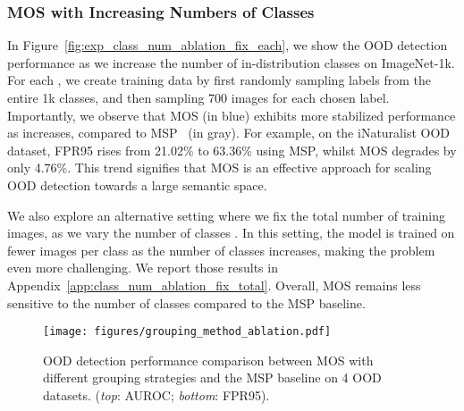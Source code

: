 \documentclass[final]{cvpr}
\begin{document}
\subsubsection{MOS with Increasing Numbers of Classes}
\label{sec:class_num_ablation}
\vspace{-0.2cm}
In Figure~\ref{fig:exp_class_num_ablation_fix_each}, we show the OOD detection performance as we increase the number of in-distribution classes  on ImageNet-1k. For each , we create training data by first randomly sampling  labels from the entire 1k classes, and then sampling 700 images for each chosen label.  
Importantly, we observe that MOS (in blue) exhibits more stabilized performance as  increases, compared to MSP~\cite{hendrycks2016baseline} (in gray). For example, on the iNaturalist OOD dataset, FPR95 rises from 21.02\% to 63.36\% using MSP, whilst MOS degrades by only 4.76\%. This trend signifies that MOS is an effective approach for scaling OOD detection towards a large semantic space. 



We also explore an alternative setting where we fix the total number of training images, as we vary the number of classes . In this setting, the model is trained on fewer images per class as the number of classes increases, making the problem even more challenging. We  report those results in Appendix~\ref{app:class_num_ablation_fix_total}. Overall, MOS remains less sensitive to the number of classes compared to the MSP baseline.







\begin{figure}[t]
    \centering
    \vspace{-0.3cm}
    \texttt{[image: figures/grouping\_method\_ablation.pdf]}
    \caption{\small{OOD detection performance comparison between MOS with different grouping strategies and the MSP baseline on 4 OOD datasets. (\textit{top}: AUROC; \textit{bottom}: FPR95).}}
    \label{fig:exp_group_method_ablation}
    \vspace{-0.3cm}
\end{figure}

\vspace{-0.3cm}
\end{document}
